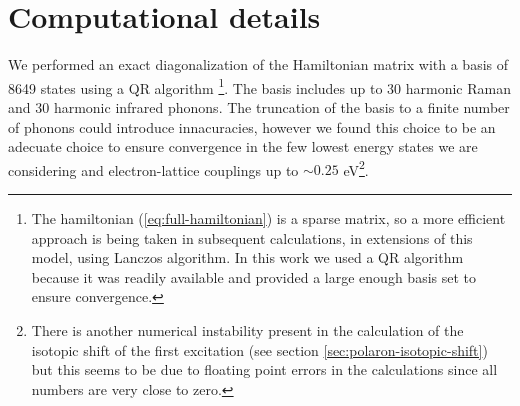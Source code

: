 

\section{Computational details}
\label{sec:comp_details}

We performed an exact diagonalization of the Hamiltonian matrix with a basis of 8649 states using a QR algorithm \cite{eigenweb}\footnote{The hamiltonian (\ref{eq:full-hamiltonian}) is a sparse matrix, so a more efficient approach is being taken in subsequent calculations, in extensions of this model, using Lanczos algorithm. In this work we used a QR algorithm because it was readily available and provided a large enough basis set to ensure convergence.}.
The basis includes up to 30 harmonic Raman and 30 harmonic infrared phonons. 
The  truncation of the basis to a finite number of phonons could introduce innacuracies, however we found this choice to be an adecuate choice to ensure convergence in the few lowest energy states we are considering and electron-lattice couplings up to $\sim0.25$ eV\footnote{There is another numerical instability present in the calculation of the isotopic shift of the first excitation (see section \ref{sec:polaron-isotopic-shift}) but this seems to be due to floating point errors in the calculations since all numbers are very close to zero.}.

